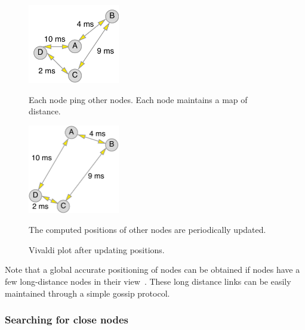 \begin{figure}
  \begin{minipage}[c]{.45\linewidth}
	\vspace*{.5cm}
   \hspace*{-0.5cm}
      	\centering \includegraphics[width=4cm]{./FIGS/vivaldi_before.pdf}

   \hspace*{0.5cm}
	\vspace*{.4cm}
		\caption{Vivaldi plot before updating positions.}
		{\small Each node ping other nodes. Each node maintains a map of distance.}
\label{fig:vivaldi_before}
   \end{minipage}
\hspace*{0.6cm}
   \begin{minipage}[c]{.45\linewidth}
   	\centering \includegraphics[width=4cm]{./FIGS/vivaldi_after.pdf}
	\vspace*{0.20cm}
		\caption{Vivaldi plot after updating positions.}
		\label{fig:vivaldi_after} 
{\small The computed positions of other nodes are periodically updated.}
  \end{minipage} \hfill
\end{figure}

\newpage

Note that a global accurate positioning of nodes can be
obtained if nodes have a few long-distance nodes in their
view~\cite{dabek:2001:sigcomm04}. These long distance links can be easily
maintained through a simple gossip protocol.

\subsubsection*{Searching for close nodes}

